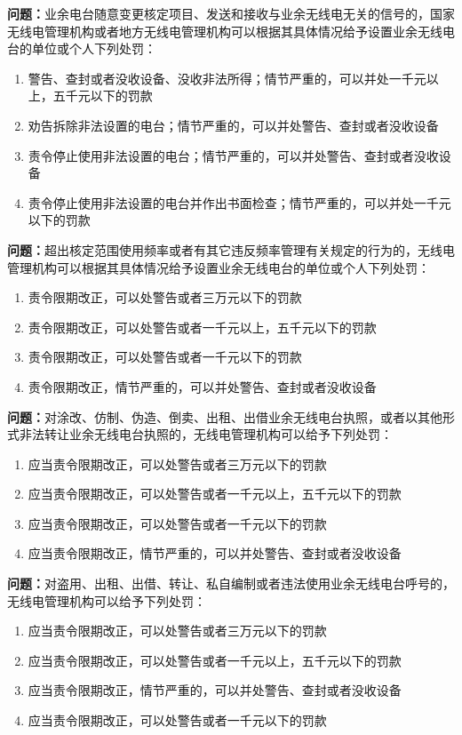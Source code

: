 \textbf{问题：}业余电台随意变更核定项目、发送和接收与业余无线电无关的信号的，国家无线电管理机构或者地方无线电管理机构可以根据其具体情况给予设置业余无线电台的单位或个人下列处罚：
\begin{enumerate}[label=\Alph*), leftmargin=1cm]
	\item  警告、查封或者没收设备、没收非法所得；情节严重的，可以并处一千元以上，五千元以下的罚款
	\item  劝告拆除非法设置的电台；情节严重的，可以并处警告、查封或者没收设备
	\item  责令停止使用非法设置的电台；情节严重的，可以并处警告、查封或者没收设备
	\item  责令停止使用非法设置的电台并作出书面检查；情节严重的，可以并处一千元以下的罚款
\end{enumerate}

\textbf{问题：}超出核定范围使用频率或者有其它违反频率管理有关规定的行为的，无线电管理机构可以根据其具体情况给予设置业余无线电台的单位或个人下列处罚：
\begin{enumerate}[label=\Alph*), leftmargin=1cm]
  \item 责令限期改正，可以处警告或者三万元以下的罚款
  \item 责令限期改正，可以处警告或者一千元以上，五千元以下的罚款
  \item 责令限期改正，可以处警告或者一千元以下的罚款
  \item 责令限期改正，情节严重的，可以并处警告、查封或者没收设备
\end{enumerate}

\textbf{问题：}对涂改、仿制、伪造、倒卖、出租、出借业余无线电台执照，或者以其他形式非法转让业余无线电台执照的，无线电管理机构可以给予下列处罚：
\begin{enumerate}[label=\Alph*), leftmargin=1cm]
  \item 应当责令限期改正，可以处警告或者三万元以下的罚款
  \item 应当责令限期改正，可以处警告或者一千元以上，五千元以下的罚款
  \item 应当责令限期改正，可以处警告或者一千元以下的罚款
  \item 应当责令限期改正，情节严重的，可以并处警告、查封或者没收设备
\end{enumerate}

\textbf{问题：}对盗用、出租、出借、转让、私自编制或者违法使用业余无线电台呼号的，无线电管理机构可以给予下列处罚：
\begin{enumerate}[label=\Alph*), leftmargin=1cm]
  \item 应当责令限期改正，可以处警告或者三万元以下的罚款
  \item 应当责令限期改正，可以处警告或者一千元以上，五千元以下的罚款
  \item 应当责令限期改正，情节严重的，可以并处警告、查封或者没收设备
  \item 应当责令限期改正，可以处警告或者一千元以下的罚款
\end{enumerate}


